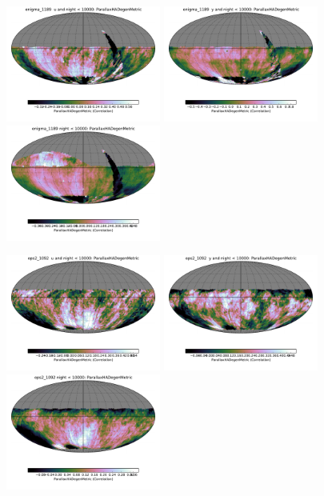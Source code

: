 \begin{figure}[ht]
  \begin{center}
  \includegraphics[width=2.0in]{./figs/milkyway/MW_Astrom_paDegen_1189_u_map.pdf}
  \includegraphics[width=2.0in]{./figs/milkyway/MW_Astrom_paDegen_1189_y_map.pdf}
  \includegraphics[width=2.0in]{./figs/milkyway/MW_Astrom_paDegen_1189_10y_map.pdf}
  \end{center}
  \begin{center}
  \includegraphics[width=2.0in]{./figs/milkyway/MW_Astrom_paDegen_1092_u_map.pdf}
  \includegraphics[width=2.0in]{./figs/milkyway/MW_Astrom_paDegen_1092_y_map.pdf}
  \includegraphics[width=2.0in]{./figs/milkyway/MW_Astrom_paDegen_1092_10y_map.pdf}
  \end{center}


\end{figure}
